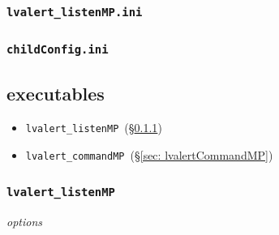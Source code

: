\documentclass{article}
\newcommand{\lvalertListenMP}{\texttt{lvalert\_listenMP}~}
\newcommand{\lvalertCommandMP}{\texttt{lvalert\_commandMP}~}
\newcommand{\lvalertMPini}{\texttt{lvalert\_listenMP.ini}~}
\newcommand{\childConfigini}{\texttt{childConfig.ini}~}
\begin{document}

\subsubsection{\lvalertMPini}
\label{sec: lvalertMPini}


\subsubsection{\childConfigini}
\label{sec: childConfigini}


\subsection{executables}
\label{sec: executables}

\begin{itemize}
    \item{\lvalertListenMP (\S\ref{sec: lvalertListenMP})}
    \item{\lvalertCommandMP (\S\ref{sec: lvalertCommandMP})}
\end{itemize}


\subsubsection{\lvalertListenMP}
\label{sec: lvalertListenMP}

\vspace{0.5cm}
\noindent
\textit{options}
\end{document}
